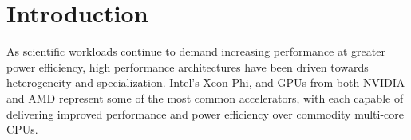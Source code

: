 \begin{comment}
\begin{abstract}
As more scientific workloads are moved into the cloud, the need for high
performance accelerators increases.  Accelerators such as GPUs offer
improvements in both performance and power efficiency over traditional
multi-core processors; however, their use in the cloud has been limited.  Today,
several common hypervisors support GPU-passthrough, but their performance has
not been systematically characterized.  

In this paper we show that low overhead PCI passthrough is achievable across 4
major hypervisors and two processor microarchitectures. We compare the performance of two generations of NVIDIA
GPUs within the Xen, VMWare ESXi, and KVM hypervisors, and we also compare the
performance to that of Linux Containers (LXC). We show that GPU passthrough to
KVM achieves 98--100\% of the base system's performance across two
architectures, while Xen and VMWare achieve 96--99\% of the base systems
performance, respectively.   In addition, we describe several
valuable lessons learned through our analysis and share the
advantages and disadvantages of each hypervisor/PCI passthrough solution. 

\end{abstract}
\end{comment}
\section{Introduction}




As scientific workloads continue to demand increasing performance at greater
power efficiency, high performance architectures have been driven towards heterogeneity and
specialization.  Intel's Xeon Phi, and GPUs from both NVIDIA and AMD represent some
of the most common accelerators, with each capable of delivering improved
performance and power efficiency over commodity multi-core CPUs. 


